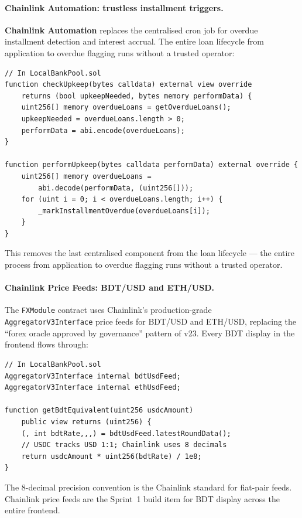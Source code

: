 \documentclass[12pt,a4paper]{report}
\begin{document}
\paragraph{Chainlink Automation: trustless installment triggers.}
\textbf{Chainlink Automation} replaces the centralised cron job for overdue installment detection and interest accrual. The entire loan lifecycle from application to overdue flagging runs without a trusted operator:

\begin{verbatim}
// In LocalBankPool.sol
function checkUpkeep(bytes calldata) external view override
    returns (bool upkeepNeeded, bytes memory performData) {
    uint256[] memory overdueLoans = getOverdueLoans();
    upkeepNeeded = overdueLoans.length > 0;
    performData = abi.encode(overdueLoans);
}

function performUpkeep(bytes calldata performData) external override {
    uint256[] memory overdueLoans =
        abi.decode(performData, (uint256[]));
    for (uint i = 0; i < overdueLoans.length; i++) {
        _markInstallmentOverdue(overdueLoans[i]);
    }
}
\end{verbatim}

This removes the last centralised component from the loan lifecycle --- the entire process from application to overdue flagging runs without a trusted operator.

\paragraph{Chainlink Price Feeds: BDT/USD and ETH/USD.}
The \texttt{FXModule} contract uses Chainlink's production-grade \texttt{AggregatorV3Interface} price feeds for BDT/USD and ETH/USD, replacing the ``forex oracle approved by governance'' pattern of v23. Every BDT display in the frontend flows through:

\begin{verbatim}
// In LocalBankPool.sol
AggregatorV3Interface internal bdtUsdFeed;
AggregatorV3Interface internal ethUsdFeed;

function getBdtEquivalent(uint256 usdcAmount)
    public view returns (uint256) {
    (, int bdtRate,,,) = bdtUsdFeed.latestRoundData();
    // USDC tracks USD 1:1; Chainlink uses 8 decimals
    return usdcAmount * uint256(bdtRate) / 1e8;
}
\end{verbatim}

The 8-decimal precision convention is the Chainlink standard for fiat-pair feeds. Chainlink price feeds are the Sprint~1 build item for BDT display across the entire frontend.
\end{document}
